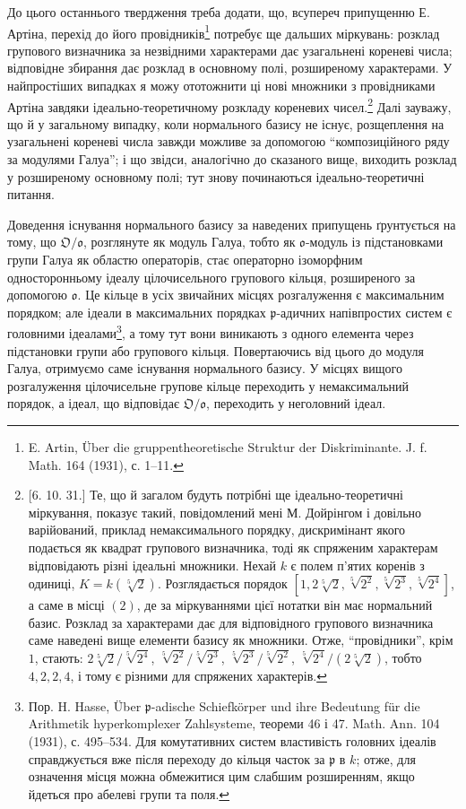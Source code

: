 \documentclass[11pt]{article}
\providecommand{\frakO}{\mathfrak{O}}
\providecommand{\frako}{\mathfrak{o}}
\providecommand{\frakp}{\mathfrak{p}}
\begin{document}
До цього останнього твердження треба додати, що, всупереч припущенню Е. Артіна, перехід до його провідників\footnote{E. Artin, Über die gruppentheoretische Struktur der Diskriminante. J. f. Math. 164 (1931), с. 1--11.} потребує ще дальших міркувань: розклад групового визначника за незвідними характерами дає узагальнені кореневі числа; відповідне збирання дає розклад в основному полі, розширеному характерами. У найпростіших випадках я можу ототожнити ці нові множники з провідниками Артіна завдяки ідеально-теоретичному розкладу кореневих чисел.\footnote{[6. 10. 31.] Те, що й загалом будуть потрібні ще ідеально-теоретичні міркування, показує такий, повідомлений мені М. Дойрінгом і довільно варійований, приклад немаксимального порядку, дискримінант якого подається як квадрат групового визначника, тоді як спряженим характерам відповідають різні ідеальні множники. Нехай \(k\) є полем п'ятих коренів з одиниці, \(K=k(\sqrt[5]{2})\). Розглядається порядок \([1,2\sqrt[5]{2},\sqrt[5]{2^2},\sqrt[5]{2^3},\sqrt[5]{2^4}]\), а саме в місці \((2)\), де за міркуваннями цієї нотатки він має нормальний базис. Розклад за характерами дає для відповідного групового визначника саме наведені вище елементи базису як множники. Отже, ``провідники'', крім \(1\), стають: \(2\sqrt[5]{2}/\sqrt[5]{2^4}\), \(\sqrt[5]{2^2}/\sqrt[5]{2^3}\), \(\sqrt[5]{2^3}/\sqrt[5]{2^2}\), \(\sqrt[5]{2^4}/(2\sqrt[5]{2})\), тобто \(4,2,2,4\), і тому є різними для спряжених характерів.} Далі зауважу, що й у загальному випадку, коли нормального базису не існує, розщеплення на узагальнені кореневі числа завжди можливе за допомогою ``композиційного ряду за модулями Галуа''; і що звідси, аналогічно до сказаного вище, виходить розклад у розширеному основному полі; тут знову починаються ідеально-теоретичні питання.

Доведення існування нормального базису за наведених припущень ґрунтується на тому, що \(\frakO/\frako\), розглянуте як модуль Галуа, тобто як \(\frako\)-модуль із підстановками групи Галуа як областю операторів, стає операторно ізоморфним односторонньому ідеалу цілочисельного групового кільця, розширеного за допомогою \(\frako\). Це кільце в усіх звичайних місцях розгалуження є максимальним порядком; але ідеали в максимальних порядках \(\frakp\)-адичних напівпростих систем є головними ідеалами\footnote{Пор. H. Hasse, Über \(\frakp\)-adische Schiefkörper und ihre Bedeutung für die Arithmetik hyperkomplexer Zahlsysteme, теореми 46 і 47. Math. Ann. 104 (1931), с. 495--534. Для комутативних систем властивість головних ідеалів справджується вже після переходу до кільця часток за \(\frakp\) в \(k\); отже, для означення місця можна обмежитися цим слабшим розширенням, якщо йдеться про абелеві групи та поля.}, а тому тут вони виникають з одного елемента через підстановки групи або групового кільця. Повертаючись від цього до модуля Галуа, отримуємо саме існування нормального базису. У місцях вищого розгалуження цілочисельне групове кільце переходить у немаксимальний порядок, а ідеал, що відповідає \(\frakO/\frako\), переходить у неголовний ідеал.
\end{document}
